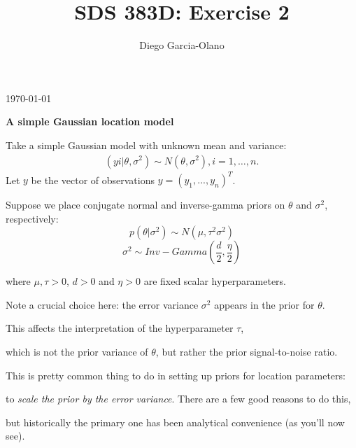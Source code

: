 \documentclass{homework}
\title{SDS 383D: Exercise 2}
\author{Diego Garcia-Olano}
\begin{document}
\makeatletter
\begin{titlepage}
	\vspace*{\fill}
	\centering
	{\huge \@title \par}
	\vskip0.5cm
	{\large \@author \par}
	\vskip0.5cm
	{\large \today \par}
	\vspace*{\fill}
\end{titlepage}
\makeatother
\newpage 
\mbox{}
\thispagestyle{empty}
\newpage
\setcounter{page}{1}


\par \textbf{A simple Gaussian location model}
\par Take a simple Gaussian model with unknown mean and variance:
\begin{equation} \begin{split}
(yi | \theta,\sigma^2) \sim N(\theta,\sigma^2) , i = 1,\dots,n. 
\end{split}\end{equation}
Let $y$ be the vector of observations $y = (y_1, . . . , y_n)^T$.\\

\par Suppose we place conjugate normal and inverse-gamma priors on $\theta$  and $\sigma^2$, respectively:
$$p(\theta | \sigma^2) \sim N(\mu, \tau^2\sigma^2 )$$
$$\sigma^2 \sim Inv-Gamma(\frac{d}{2}, \frac{\eta}{2} )$$
\par where $\mu, \tau > 0$, $d > 0$ and $\eta > 0$ are fixed scalar hyperparameters.\\

\par *Note a crucial choice here: the error variance $\sigma^2$ appears in the prior for $\theta$. 
\par This affects the interpretation of the hyperparameter $\tau$, \par which is not the prior variance of $\theta$, but rather the prior signal-to-noise ratio.\par This is pretty common thing to do in setting up priors for location parameters: \par to \textit{ scale the prior by the error variance}. There are a few good reasons to do this, \par but historically the primary one has been analytical convenience (as you'll now see). \\
\end{document}

